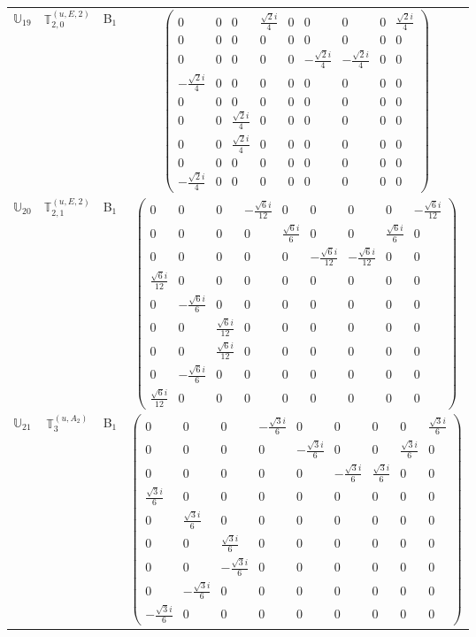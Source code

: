 \documentclass[fleqn,10pt,landscape]{article}
\begin{document}
\begin{itemize}
\begin{center}
\begin{longtable}{c|c|c|c}
$ \mathbb{U}_{19} $ & $\mathbb{T}_{2,0}^{(u,E,2)}$ & B$_{1}$ & $\begin{pmatrix} 0 & 0 & 0 & \frac{\sqrt{2} i}{4} & 0 & 0 & 0 & 0 & \frac{\sqrt{2} i}{4} \\ 0 & 0 & 0 & 0 & 0 & 0 & 0 & 0 & 0 \\ 0 & 0 & 0 & 0 & 0 & - \frac{\sqrt{2} i}{4} & - \frac{\sqrt{2} i}{4} & 0 & 0 \\ - \frac{\sqrt{2} i}{4} & 0 & 0 & 0 & 0 & 0 & 0 & 0 & 0 \\ 0 & 0 & 0 & 0 & 0 & 0 & 0 & 0 & 0 \\ 0 & 0 & \frac{\sqrt{2} i}{4} & 0 & 0 & 0 & 0 & 0 & 0 \\ 0 & 0 & \frac{\sqrt{2} i}{4} & 0 & 0 & 0 & 0 & 0 & 0 \\ 0 & 0 & 0 & 0 & 0 & 0 & 0 & 0 & 0 \\ - \frac{\sqrt{2} i}{4} & 0 & 0 & 0 & 0 & 0 & 0 & 0 & 0 \end{pmatrix}$ \\
$ \mathbb{U}_{20} $ & $\mathbb{T}_{2,1}^{(u,E,2)}$ & B$_{1}$ & $\begin{pmatrix} 0 & 0 & 0 & - \frac{\sqrt{6} i}{12} & 0 & 0 & 0 & 0 & - \frac{\sqrt{6} i}{12} \\ 0 & 0 & 0 & 0 & \frac{\sqrt{6} i}{6} & 0 & 0 & \frac{\sqrt{6} i}{6} & 0 \\ 0 & 0 & 0 & 0 & 0 & - \frac{\sqrt{6} i}{12} & - \frac{\sqrt{6} i}{12} & 0 & 0 \\ \frac{\sqrt{6} i}{12} & 0 & 0 & 0 & 0 & 0 & 0 & 0 & 0 \\ 0 & - \frac{\sqrt{6} i}{6} & 0 & 0 & 0 & 0 & 0 & 0 & 0 \\ 0 & 0 & \frac{\sqrt{6} i}{12} & 0 & 0 & 0 & 0 & 0 & 0 \\ 0 & 0 & \frac{\sqrt{6} i}{12} & 0 & 0 & 0 & 0 & 0 & 0 \\ 0 & - \frac{\sqrt{6} i}{6} & 0 & 0 & 0 & 0 & 0 & 0 & 0 \\ \frac{\sqrt{6} i}{12} & 0 & 0 & 0 & 0 & 0 & 0 & 0 & 0 \end{pmatrix}$ \\
$ \mathbb{U}_{21} $ & $\mathbb{T}_{3}^{(u,A_{2})}$ & B$_{1}$ & $\begin{pmatrix} 0 & 0 & 0 & - \frac{\sqrt{3} i}{6} & 0 & 0 & 0 & 0 & \frac{\sqrt{3} i}{6} \\ 0 & 0 & 0 & 0 & - \frac{\sqrt{3} i}{6} & 0 & 0 & \frac{\sqrt{3} i}{6} & 0 \\ 0 & 0 & 0 & 0 & 0 & - \frac{\sqrt{3} i}{6} & \frac{\sqrt{3} i}{6} & 0 & 0 \\ \frac{\sqrt{3} i}{6} & 0 & 0 & 0 & 0 & 0 & 0 & 0 & 0 \\ 0 & \frac{\sqrt{3} i}{6} & 0 & 0 & 0 & 0 & 0 & 0 & 0 \\ 0 & 0 & \frac{\sqrt{3} i}{6} & 0 & 0 & 0 & 0 & 0 & 0 \\ 0 & 0 & - \frac{\sqrt{3} i}{6} & 0 & 0 & 0 & 0 & 0 & 0 \\ 0 & - \frac{\sqrt{3} i}{6} & 0 & 0 & 0 & 0 & 0 & 0 & 0 \\ - \frac{\sqrt{3} i}{6} & 0 & 0 & 0 & 0 & 0 & 0 & 0 & 0 \end{pmatrix}$ \\

\end{longtable}
\end{center}
\end{itemize}
\end{document}

